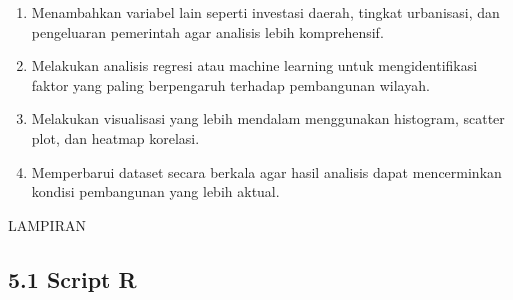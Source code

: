 \documentclass[
  12pt,
]{article}
\providecommand{\tightlist}{%
  \setlength{\itemsep}{0pt}\setlength{\parskip}{0pt}}
\begin{document}
\begin{enumerate}
\def\labelenumi{\arabic{enumi}.}
\tightlist
\item
  Menambahkan variabel lain seperti investasi daerah, tingkat
  urbanisasi, dan pengeluaran pemerintah agar analisis lebih
  komprehensif.
\item
  Melakukan analisis regresi atau machine learning untuk
  mengidentifikasi faktor yang paling berpengaruh terhadap pembangunan
  wilayah.
\item
  Melakukan visualisasi yang lebih mendalam menggunakan histogram,
  scatter plot, dan heatmap korelasi.
\item
  Memperbarui dataset secara berkala agar hasil analisis dapat
  mencerminkan kondisi pembangunan yang lebih aktual.
\end{enumerate}

\setcounter{page}{4}

\newpage

\begin{center}
  {
    \bfseries
    
    \vfill
    
    \Large
    
    LAMPIRAN
  }
\end{center}

\subsection{\texorpdfstring{\normalsize 5.1 \hspace {0,5cm} Script
R}{5.1  Script R}}\label{script-r}
\end{document}
